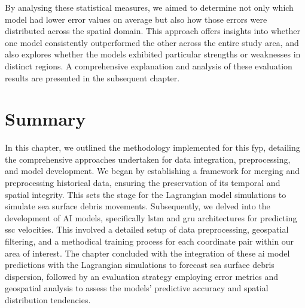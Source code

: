 By analysing these statistical measures, we aimed to determine not only which model had lower error values on average but also how those errors were distributed across the spatial domain. This approach offers insights into whether one model consistently outperformed the other across the entire study area, and also explores whether the models exhibited particular strengths or weaknesses in distinct regions. A comprehensive explanation and analysis of these evaluation results are presented in the subsequent chapter.

\section{Summary}
\label{sec:3.6}

In this chapter, we outlined the methodology implemented for this \acrshort{fyp}, detailing the comprehensive approaches undertaken for data integration, preprocessing, and model development. We began by establishing a framework for merging and preprocessing historical data, ensuring the preservation of its temporal and spatial integrity. This sets the stage for the Lagrangian model simulations to simulate sea surface debris movements. Subsequently, we delved into the development of AI models, specifically \acrshort{lstm} and \acrshort{gru} architectures for predicting \acrshort{ssc} velocities. This involved a detailed setup of data preprocessing, geospatial filtering, and a methodical training process for each coordinate pair within our area of interest. The chapter concluded with the integration of these \acrshort{ai} model predictions with the Lagrangian simulations to forecast sea surface debris dispersion, followed by an evaluation strategy employing error metrics and geospatial analysis to assess the models' predictive accuracy and spatial distribution tendencies.